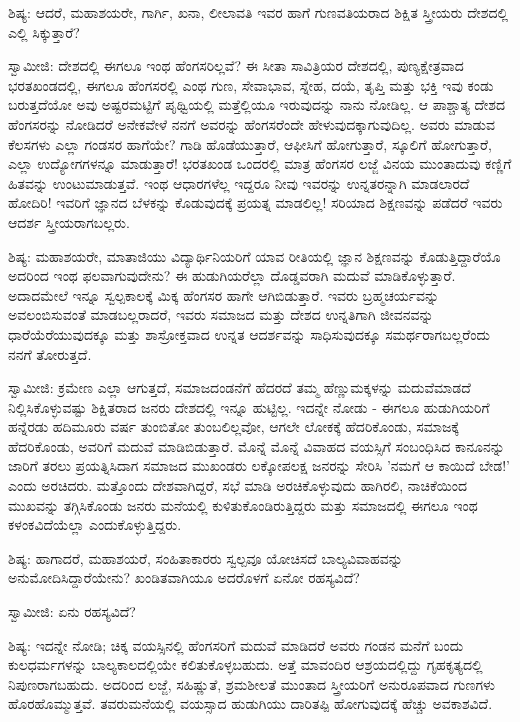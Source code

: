 ಶಿಷ್ಯ: ಆದರೆ, ಮಹಾಶಯರೇ, ಗಾರ್ಗಿ, ಖನಾ, ಲೀಲಾವತಿ ಇವರ ಹಾಗೆ ಗುಣವತಿಯರಾದ ಶಿಕ್ಷಿತ ಸ್ತ್ರೀಯರು ದೇಶದಲ್ಲಿ ಎಲ್ಲಿ ಸಿಕ್ಕುತ್ತಾರೆ?

ಸ್ವಾಮೀಜಿ: ದೇಶದಲ್ಲಿ ಈಗಲೂ ಇಂಥ ಹೆಂಗಸರಿಲ್ಲವೆ? ಈ ಸೀತಾ ಸಾವಿತ್ರಿಯರ ದೇಶದಲ್ಲಿ, ಪುಣ್ಯಕ್ಷೇತ್ರವಾದ ಭರತಖಂಡದಲ್ಲಿ, ಈಗಲೂ ಹೆಂಗಸರಲ್ಲಿ ಎಂಥ ಗುಣ, ಸೇವಾಭಾವ, ಸ್ನೇಹ, ದಯೆ, ತೃಪ್ತಿ ಮತ್ತು ಭಕ್ತಿ ಇವು ಕಂಡು ಬರುತ್ತದೆಯೋ ಅವು ಅಷ್ಟರಮಟ್ಟಿಗೆ ಪೃಥ್ವಿಯಲ್ಲಿ ಮತ್ತೆಲ್ಲಿಯೂ ಇರುವುದನ್ನು ನಾನು ನೋಡಿಲ್ಲ. ಆ ಪಾಶ್ಚಾತ್ಯ ದೇಶದ ಹೆಂಗಸರನ್ನು ನೋಡಿದರೆ ಅನೇಕವೇಳೆ ನನಗೆ ಅವರನ್ನು ಹೆಂಗಸರೆಂದೇ ಹೇಳುವುದಕ್ಕಾಗುವುದಿಲ್ಲ. ಅವರು ಮಾಡುವ ಕೆಲಸಗಳು ಎಲ್ಲಾ ಗಂಡಸರ ಹಾಗೆಯೇ? ಗಾಡಿ ಹೊಡೆಯುತ್ತಾರೆ, ಆಫೀಸಿಗೆ ಹೋಗುತ್ತಾರೆ, ಸ್ಕೂಲಿಗೆ ಹೋಗುತ್ತಾರೆ, ಎಲ್ಲಾ ಉದ್ಯೋಗಗಳನ್ನೂ ಮಾಡುತ್ತಾರೆ! ಭರತಖಂಡ ಒಂದರಲ್ಲಿ ಮಾತ್ರ ಹೆಂಗಸರ ಲಜ್ಜೆ ವಿನಯ ಮುಂತಾದುವು ಕಣ್ಣಿಗೆ ಹಿತವನ್ನು ಉಂಟುಮಾಡುತ್ತವೆ. ಇಂಥ ಆಧಾರಗಳೆಲ್ಲ ಇದ್ದರೂ ನೀವು ಇವರನ್ನು ಉನ್ನತರನ್ನಾಗಿ ಮಾಡಲಾರದೆ ಹೋದಿರಿ! ಇವರಿಗೆ ಜ್ಞಾನದ ಬೆಳಕನ್ನು ಕೊಡುವುದಕ್ಕೆ ಪ್ರಯತ್ನ ಮಾಡಲಿಲ್ಲ! ಸರಿಯಾದ ಶಿಕ್ಷಣವನ್ನು ಪಡೆದರೆ ಇವರು ಆದರ್ಶ ಸ್ತ್ರೀಯರಾಗಬಲ್ಲರು.

ಶಿಷ್ಯ: ಮಹಾಶಯರೇ, ಮಾತಾಜಿಯು ವಿದ್ಯಾರ್ಥಿನಿಯರಿಗೆ ಯಾವ ರೀತಿಯಲ್ಲಿ ಜ್ಞಾನ ಶಿಕ್ಷಣವನ್ನು ಕೊಡುತ್ತಿದ್ದಾರೆಯೊ ಅದರಿಂದ ಇಂಥ ಫಲವಾಗುವುದೇನು? ಈ ಹುಡುಗಿಯರೆಲ್ಲಾ ದೊಡ್ಡವರಾಗಿ ಮದುವೆ ಮಾಡಿಕೊಳ್ಳುತ್ತಾರೆ. ಅದಾದಮೇಲೆ ಇನ್ನೂ ಸ್ವಲ್ಪಕಾಲಕ್ಕೆ ಮಿಕ್ಕ ಹೆಂಗಸರ ಹಾಗೇ ಆಗಿಬಿಡುತ್ತಾರೆ. ಇವರು ಬ್ರಹ್ಮಚರ್ಯವನ್ನು ಅವಲಂಬಿಸುವಂತೆ ಮಾಡಬಲ್ಲರಾದರೆ, ಇವರು ಸಮಾಜದ ಮತ್ತು ದೇಶದ ಉನ್ನತಿಗಾಗಿ ಜೀವನವನ್ನು ಧಾರೆಯೆರೆಯುವುದಕ್ಕೂ ಮತ್ತು ಶಾಸ್ರೋಕ್ತವಾದ ಉನ್ನತ ಆದರ್ಶವನ್ನು ಸಾಧಿಸುವುದಕ್ಕೂ ಸಮರ್ಥರಾಗಬಲ್ಲರೆಂದು ನನಗೆ ತೋರುತ್ತದೆ.

ಸ್ವಾಮೀಜಿ: ಕ್ರಮೇಣ ಎಲ್ಲಾ ಆಗುತ್ತದೆ, ಸಮಾಜದಂಡನೆಗೆ ಹೆದರದೆ ತಮ್ಮ ಹೆಣ್ಣುಮಕ್ಕಳನ್ನು ಮದುವೆಮಾಡದೆ ನಿಲ್ಲಿಸಿಕೊಳ್ಳುವಷ್ಟು ಶಿಕ್ಷಿತರಾದ ಜನರು ದೇಶದಲ್ಲಿ ಇನ್ನೂ ಹುಟ್ಟಿಲ್ಲ. ಇದನ್ನೇ ನೋಡು - ಈಗಲೂ ಹುಡುಗಿಯರಿಗೆ ಹನ್ನೆರಡು ಹದಿಮೂರು ವರ್ಷ ತುಂಬಿತೋ ತುಂಬಲಿಲ್ಲವೋ, ಆಗಲೇ ಲೋಕಕ್ಕೆ ಹೆದರಿಕೊಂಡು, ಸಮಾಜಕ್ಕೆ ಹೆದರಿಕೊಂಡು, ಅವರಿಗೆ ಮದುವೆ ಮಾಡಿಬಿಡುತ್ತಾರೆ. ಮೊನ್ನೆ ಮೊನ್ನೆ ವಿವಾಹದ ವಯಸ್ಸಿಗೆ ಸಂಬಂಧಿಸಿದ ಕಾನೂನನ್ನು ಜಾರಿಗೆ ತರಲು ಪ್ರಯತ್ನಿಸಿದಾಗ ಸಮಾಜದ ಮುಖಂಡರು ಲಕ್ಕೋಪಲಕ್ಷ ಜನರನ್ನು ಸೇರಿಸಿ 'ನಮಗೆ ಆ ಕಾಯಿದೆ ಬೇಡ!' ಎಂದು ಅರಚಿದರು. ಮತ್ತೊಂದು ದೇಶವಾಗಿದ್ದರೆ, ಸಭೆ ಮಾಡಿ ಅರಚಿಕೊಳ್ಳುವುದು ಹಾಗಿರಲಿ, ನಾಚಿಕೆಯಿಂದ ಮುಖವನ್ನು ತಗ್ಗಿಸಿಕೊಂಡು ಜನರು ಮನೆಯಲ್ಲಿ ಕುಳಿತುಕೊಂಡಿರುತ್ತಿದ್ದರು ಮತ್ತು ಸಮಾಜದಲ್ಲಿ ಈಗಲೂ ಇಂಥ ಕಳಂಕವಿದೆಯೆಲ್ಲಾ ಎಂದುಕೊಳ್ಳುತ್ತಿದ್ದರು.

ಶಿಷ್ಯ: ಹಾಗಾದರೆ, ಮಹಾಶಯರೆ, ಸಂಹಿತಾಕಾರರು ಸ್ವಲ್ಪವೂ ಯೋಚಿಸದೆ ಬಾಲ್ಯವಿವಾಹವನ್ನು ಅನುಮೋದಿಸಿದ್ದಾರೆಯೇನು? ಖಂಡಿತವಾಗಿಯೂ ಅದರೊಳಗೆ ಏನೋ ರಹಸ್ಯವಿದೆ?

ಸ್ವಾಮೀಜಿ: ಏನು ರಹಸ್ಯವಿದೆ?

ಶಿಷ್ಯ: ಇದನ್ನೇ ನೋಡಿ; ಚಿಕ್ಕ ವಯಸ್ಸಿನಲ್ಲಿ ಹೆಂಗಸರಿಗೆ ಮದುವೆ ಮಾಡಿದರೆ ಅವರು ಗಂಡನ ಮನೆಗೆ ಬಂದು ಕುಲಧರ್ಮಗಳನ್ನು ಬಾಲ್ಯಕಾಲದಲ್ಲಿಯೇ ಕಲಿತುಕೊಳ್ಳಬಹುದು. ಅತ್ತೆ ಮಾವಂದಿರ ಆಶ್ರಯದಲ್ಲಿದ್ದು ಗೃಹಕೃತ್ಯದಲ್ಲಿ ನಿಪುಣರಾಗಬಹುದು. ಅದರಿಂದ ಲಜ್ಜೆ, ಸಹಿಷ್ಣುತೆ, ಶ್ರಮಶೀಲತೆ ಮುಂತಾದ ಸ್ತ್ರೀಯರಿಗೆ ಅನುರೂಪವಾದ ಗುಣಗಳು ಹೊರಹೊಮ್ಮುತ್ತವೆ. ತವರುಮನೆಯಲ್ಲಿ ವಯಸ್ಸಾದ ಹುಡುಗಿಯು ದಾರಿತಪ್ಪಿ ಹೋಗುವುದಕ್ಕೆ ಹೆಚ್ಚು ಅವಕಾಶವಿದೆ.

